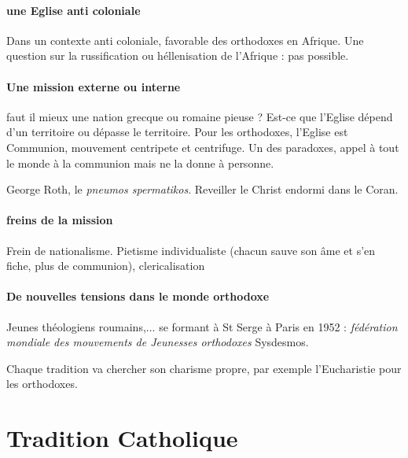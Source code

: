 \paragraph{une Eglise anti coloniale} Dans un contexte anti coloniale, favorable des orthodoxes en Afrique. Une question sur la russification ou héllenisation de l’Afrique : pas possible.

\paragraph{Une mission externe ou interne} faut il mieux une nation grecque ou romaine pieuse ? Est-ce que l’Eglise dépend d’un territoire ou dépasse le territoire. Pour les orthodoxes, l’Eglise est Communion, mouvement centripete et centrifuge. Un des paradoxes, appel à tout le monde à la communion mais ne la donne à personne. 

George Roth, le \textit{pneumos spermatikos}.  Reveiller le Christ endormi dans le Coran. 

\paragraph{freins de la mission} Frein de nationalisme. Pietisme individualiste (chacun sauve son âme et s'en fiche, plus de communion), clericalisation 

\paragraph{De nouvelles tensions dans le monde orthodoxe} Jeunes théologiens roumains,... se formant à St Serge à Paris en 1952 : \textit{fédération mondiale des mouvements de Jeunesses orthodoxes } Sysdesmos. 

\begin{Synthesis}
Chaque tradition va chercher son charisme propre, par exemple l'Eucharistie pour les orthodoxes.

\end{Synthesis}


\section{Tradition Catholique}


